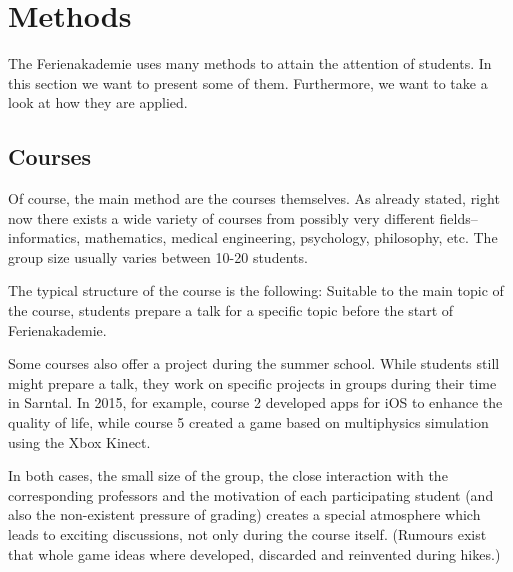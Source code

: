 \section{Methods}
The Ferienakademie uses many methods to attain the attention of students. In this section we want to present some of them. Furthermore, we want to take a look at how they are applied.
\subsection{Courses}
Of course, the main method are the courses themselves. As already stated, right now there exists a wide variety of courses from possibly very different fields-- informatics, mathematics, medical engineering, psychology, philosophy, etc. The group size usually varies between 10-20 students. 

The typical structure of the course is the following: Suitable to the main topic of the course, students prepare a talk for a specific topic before the start of Ferienakademie. 

Some courses also offer a project during the summer school. While students still might prepare a talk, they work on specific projects in groups during their time in Sarntal. In 2015, for example, course 2 developed apps for iOS to enhance the quality of life, while course 5 created a game based on multiphysics simulation using the Xbox Kinect. 

In both cases, the small size of the group, the close interaction with the corresponding professors and the motivation of each participating student (and also the non-existent pressure of grading) creates a special atmosphere which leads to exciting discussions, not only during the course itself. (Rumours exist that whole game ideas where developed, discarded and reinvented during hikes.)

